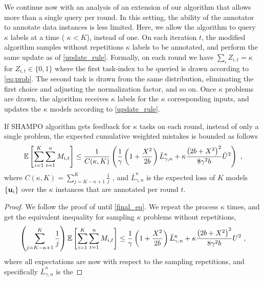 {We continue now with an analysis of an extension of our
algorithm that allows more than a single query per round. In this setting, the ability  
of the annotator to annotate data instances is less limited. Here, we
allow the algorithm to query $\kappa$ labels at a time ( $\kappa<K$), instead of one. On each
iteration $t$, the modified algorithm samples without repetitions
$\kappa$ labels to be annotated, and perform the same update as of
\eqref{update_rule}. Formally, on each round we have $\sum_i
Z_{i,t}=\kappa$ for $Z_{i,t}\in\{0,1\}$ where the first task-index to
be queried is
drawn according to \eqref{eq:prob}. The second task is drawn from the
same distribution, eliminating the first choice and adjusting the normalization factor, and so on. Once
$\kappa$ problems are drawn, the algorithm receives $\kappa$ labels for
the $\kappa$ corresponding inputs, and updates the $\kappa$ models
according to \eqref{update_rule}.
\begin{corollary}
  If SHAMPO algorithm gets feedback for $\kappa$ tasks on each round,
  instead of only a single problem, the expected cumulative weighted
  mistakes is bounded as follows
\begin{displaymath}
\mathbb{E}\left[ \sum_{i=1}^{K}\sum_{t=1}^{n}{M_{i,t}} \right] 
\le \frac{1}{C(\kappa,K)}\left({\frac{1}{\gamma}\left(1+\frac{X^2}{2b} \right){\bar L}^\kappa_{\gamma,n}
+\kappa\frac{\left({2b+X^2}\right)^2}{8{\gamma}^2b}\tilde{U}^2}\right)~,
\end{displaymath}
where $C(\kappa,K) = \sum_{j=K-\kappa+1}^{K}\frac{1}{j}$ , and
${\bar L}^\kappa_{\gamma,n}$ is the expected loss of $K$ models
$\{\mathbf{u}_{i}\}$ over the $\kappa$ instances that are annotated per round
$t$.
\end{corollary}
\begin{proof}
  We follow the proof of  until \eqref{final_eq}. We
  repeat the process $\kappa$ times, and get the equivalent inequality
  for sampling $\kappa$ problems without repetitions,
\begin{equation}
\begin{split}
  \left({\sum_{j=K-\kappa+1}^{K}\frac{1}{j}}\right)\mathbb{E}\left[ \sum_{i=1}^{K}\sum_{t=1}^{n}{M_{i,t}} \right]
\le \frac{1}{\gamma}\left(1+\frac{X^2}{2b} \right){\bar L}^\kappa_{\gamma,n}
+\kappa\frac{\left({2b+X^2}\right)^2}{8{\gamma}^2b} U^2~,
\end{split}
\label{final_eq_k}
\end{equation}
where all expectations are now with respect to the sampling 
repetitions, and specifically ${\bar L}^\kappa_{\gamma,n}$ is the

\end{proof}}
